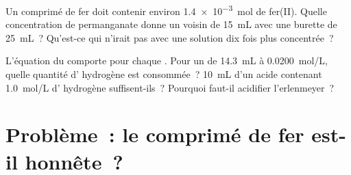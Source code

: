 \begin{exercise}[$\star\star\star$]\label{exo:g11:titration:14}
Un comprimé de fer doit contenir environ \qty{1.4e-3}{mol} de fer(II).
Quelle concentration de permanganate donne un 
voisin de \qty{15}{mL} avec une burette de \qty{25}{mL}~? Qu'est-ce qui
n'irait pas avec une solution dix fois plus concentrée~?
\end{exercise}

\begin{exercise}[$\star\star\star$]\label{exo:g11:titration:15}
L'équation du  comporte  pour chaque . Pour un
 de \qty{14.3}{mL} à \qty{0.0200}{mol/L}, quelle
quantité d' hydrogène est consommée~? \qty{10}{mL} d'un acide
contenant \qty{1.0}{mol/L} d' hydrogène suffisent-ils~? Pourquoi
faut-il acidifier l'erlenmeyer~?
\end{exercise}

\section{Problème~: le comprimé de fer est-il honnête~?}

